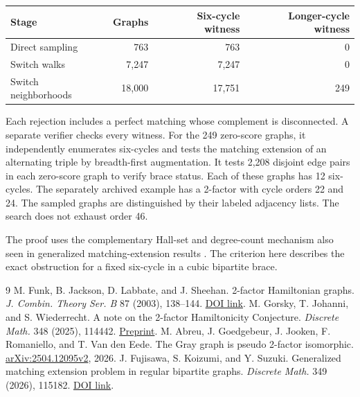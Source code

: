 \documentclass[11pt]{article}
\begin{document}
\begin{center}
\begin{tabular}{lrrr}
\toprule
Stage & Graphs & Six-cycle witness & Longer-cycle witness \\
\midrule
Direct sampling & 763 & 763 & 0 \\
Switch walks & 7,247 & 7,247 & 0 \\
Switch neighborhoods & 18,000 & 17,751 & 249 \\
\bottomrule
\end{tabular}
\end{center}

Each rejection includes a perfect matching whose complement is
disconnected. A separate verifier checks every witness. For
the 249 zero-score graphs, it independently enumerates
six-cycles and tests the matching extension of an alternating
triple by breadth-first augmentation. It tests 2,208 disjoint edge
pairs in each zero-score graph to verify brace status. Each of
these graphs has 12 six-cycles. The separately archived example
has a 2-factor with cycle orders 22 and 24. The sampled graphs are
distinguished by their labeled adjacency lists. The search does
not exhaust order 46.

The proof uses the complementary Hall-set and degree-count
mechanism also seen in generalized matching-extension results
\cite{fks}. The criterion here describes the exact obstruction
for a fixed six-cycle in a cubic bipartite brace.

\begin{thebibliography}{9}
 M. Funk, B. Jackson, D. Labbate, and J. Sheehan.
2-factor Hamiltonian graphs. \emph{J. Combin. Theory Ser. B}
87 (2003), 138--144.
\href{https://doi.org/10.1016/S0095-8956(02)00031-X}{DOI link}.
 M. Gorsky, T. Johanni, and S. Wiederrecht.
A note on the 2-factor Hamiltonicity Conjecture.
\emph{Discrete Math.} 348 (2025), 114442.
\href{https://arxiv.org/html/2408.08128v2}{Preprint}.
 M. Abreu, J. Goedgebeur, J. Jooken, F. Romaniello,
and T. Van den Eede. The Gray graph is pseudo 2-factor isomorphic.
\href{https://arxiv.org/html/2504.12095v2}{arXiv:2504.12095v2}, 2026.
 J. Fujisawa, S. Koizumi, and Y. Suzuki.
Generalized matching extension problem in regular bipartite graphs.
\emph{Discrete Math.} 349 (2026), 115182.
\href{https://doi.org/10.1016/j.disc.2026.115182}{DOI link}.
\end{thebibliography}
\end{document}
